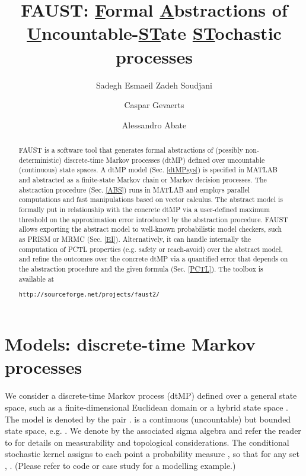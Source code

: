 \documentclass{llncs}
\newcommand{\software}{\textsf{FAUST}\xspace}
\begin{document}
\title{\software: \underline{F}ormal \underline{A}bstractions of \underline{U}ncountable-\underline{ST}ate \underline{ST}ochastic processes}
\author{Sadegh Esmaeil Zadeh Soudjani 
\and Caspar Gevaerts
\and Alessandro Abate
}

\maketitle

\begin{abstract}
\software  is a software tool that generates formal abstractions of (possibly non-deterministic) discrete-time Markov processes (dtMP) defined over uncountable (continuous) state spaces. 
A dtMP model (Sec. \ref{dtMPsys}) is specified in MATLAB  
and abstracted as a finite-state Markov chain or Markov decision processes.
The abstraction procedure (Sec. \ref{ABS}) runs in MATLAB and employs parallel computations and fast manipulations based on vector calculus.
The abstract model is formally put in relationship with the concrete dtMP via a user-defined maximum threshold on the approximation error introduced by the abstraction procedure.
\software  allows exporting the abstract model to well-known probabilistic model checkers, such as PRISM or MRMC (Sec. \ref{EI}).
Alternatively, it can handle internally the computation of PCTL properties (e.g. safety or reach-avoid) over the abstract model, and refine the outcomes over the concrete dtMP via a quantified error that depends on the abstraction procedure and the given formula (Sec. \ref{PCTL}). 
The toolbox is available at
\vspace{-0.2cm}
\begin{center}
{\small\texttt{http://sourceforge.net/projects/faust2/}}
\end{center}
\end{abstract}

\section{Models: discrete-time Markov processes}
\label{dtMPsys}
We consider a discrete-time Markov process (dtMP)   
defined over a general state space, 
such as a finite-dimensional Euclidean domain \cite{MTH1993} or a hybrid state space \cite{APLS08}. 
The model is denoted by the pair . 
 is a continuous (uncountable) but bounded state space, e.g. .
We denote by  the associated sigma algebra and refer the reader to \cite{APLS08,BS96} for details on measurability and topological considerations.
The conditional stochastic kernel  
assigns to each point  a probability measure , 
so that for any set ,
.
(Please refer to code or case study for a modelling example.)  
\end{document}
